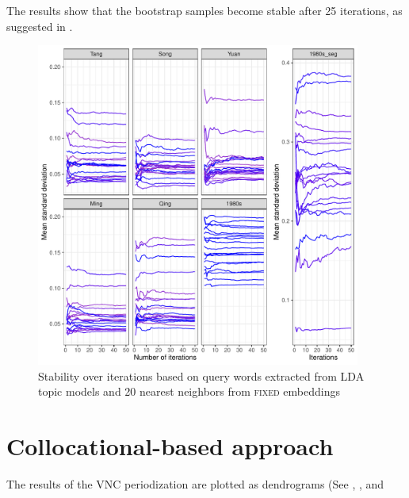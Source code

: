 The results show that the bootstrap samples become stable after 25 iterations, as suggested in \textcite{antoniak2018evaluating}. 

\begin{figure}[H]
  \centering
  \includegraphics[width=0.95\textwidth,keepaspectratio]{figures/stability_plot_mean_std}
  \caption{Stability over iterations based on query words extracted from LDA topic models and 20 nearest neighbors from \textsc{fixed} embeddings}
  \end{figure}

\section{Collocational-based approach}
The results of the VNC periodization are plotted as dendrograms (See , , and %

